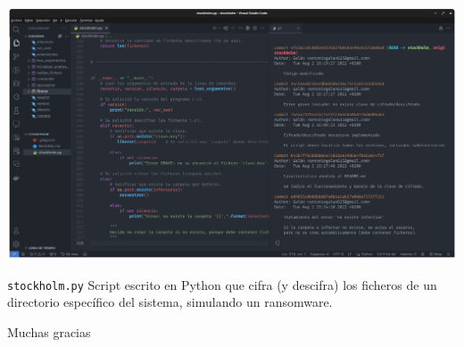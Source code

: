     \begin{frame}
        \begin{center}
            \includegraphics[scale=0.125]{images/capturas/vscode/stockholm.png}
        \end{center}

        \begin{block}{\texttt{stockholm.py}}
            Script escrito en Python que cifra (y descifra) los ficheros de un directorio específico del sistema, simulando un ransomware.
        \end{block}
    \end{frame}

    \begin{frame}
        \Huge{\centerline{Muchas gracias}}
    \end{frame}
